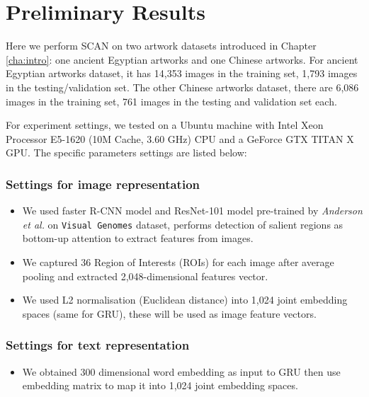 
\section{Preliminary Results}
Here we perform SCAN on two artwork datasets introduced in Chapter \ref{cha:intro}: one ancient Egyptian artworks and one Chinese artworks. For ancient Egyptian artworks dataset, it has 14,353 images in the training set, 1,793 images in the testing/validation set. The other Chinese artworks dataset, there are 6,086 images in the training set, 761 images in the testing and validation set each.

For experiment settings, we tested on a Ubuntu machine with Intel Xeon Processor E5-1620 (10M Cache, 3.60 GHz) CPU and a GeForce GTX TITAN X GPU. The specific parameters settings are listed below:

\subsubsection{Settings for image representation}

\begin{itemize}
    \item We used faster R-CNN model and ResNet-101 model pre-trained by \textit{Anderson et al.} on \verb|Visual Genomes| dataset, performs detection of salient regions as bottom-up attention to extract features from images. 
    \item We captured 36 Region of Interests (ROIs) for each image after average pooling and extracted 2,048-dimensional features vector.
    \item We used L2 normalisation (Euclidean distance) into 1,024 joint embedding spaces (same for GRU), these will be used as image feature vectors.
\end{itemize}

\subsubsection{Settings for text representation}

\begin{itemize}
    \item We obtained 300 dimensional word embedding as input to GRU then use embedding matrix to map it into 1,024 joint embedding spaces.
\end{itemize}

